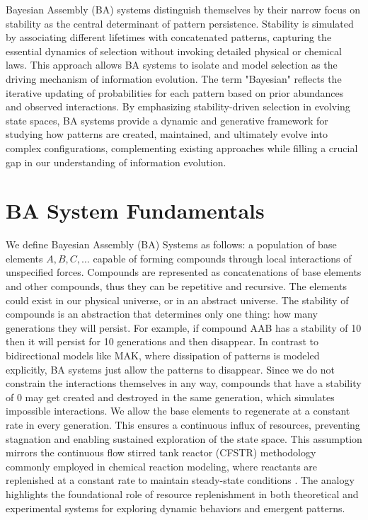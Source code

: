 \documentclass[entropy,article,submit,pdftex,moreauthors]{Definitions/mdpi}
\begin{document}
Bayesian Assembly (BA) systems distinguish themselves by their narrow focus on stability as the central determinant of pattern persistence. Stability is simulated by associating different lifetimes with concatenated patterns, capturing the essential dynamics of selection without invoking detailed physical or chemical laws. This approach allows BA systems to isolate and model selection as the driving mechanism of information evolution. The term "Bayesian" \cite{mcgrayne2011theory} reflects the iterative updating of probabilities for each pattern based on prior abundances and observed interactions. By emphasizing stability-driven selection in evolving state spaces, BA systems provide a dynamic and generative framework for studying how patterns are created, maintained, and ultimately evolve into complex configurations, complementing existing approaches while filling a crucial gap in our understanding of information evolution.

\section{BA System Fundamentals}

We define Bayesian Assembly (BA) Systems as follows: a population of base elements \( A, B, C, \dots \) capable of forming compounds through local interactions of unspecified forces. Compounds are represented as concatenations of base elements and other compounds, thus they can be repetitive and recursive. The elements could exist in our physical universe, or in an abstract universe. The stability of compounds is an abstraction that determines only one thing: how many generations they will persist. For example, if compound AAB has a stability of 10 then it will persist for 10 generations and then disappear. In contrast to bidirectional models like MAK, where dissipation of patterns is modeled explicitly, BA systems just allow the patterns to disappear. Since we do not constrain the interactions themselves in any way, compounds that have a stability of 0 may get created and destroyed in the same generation, which simulates impossible interactions. We allow the base elements to regenerate at a constant rate in every generation. This ensures a continuous influx of resources, preventing stagnation and enabling sustained exploration of the state space. This assumption mirrors the continuous flow stirred tank reactor (CFSTR) methodology commonly employed in chemical reaction modeling, where reactants are replenished at a constant rate to maintain steady-state conditions \cite{fogler1999chemical}. The analogy highlights the foundational role of resource replenishment in both theoretical and experimental systems for exploring dynamic behaviors and emergent patterns.
\end{document}

